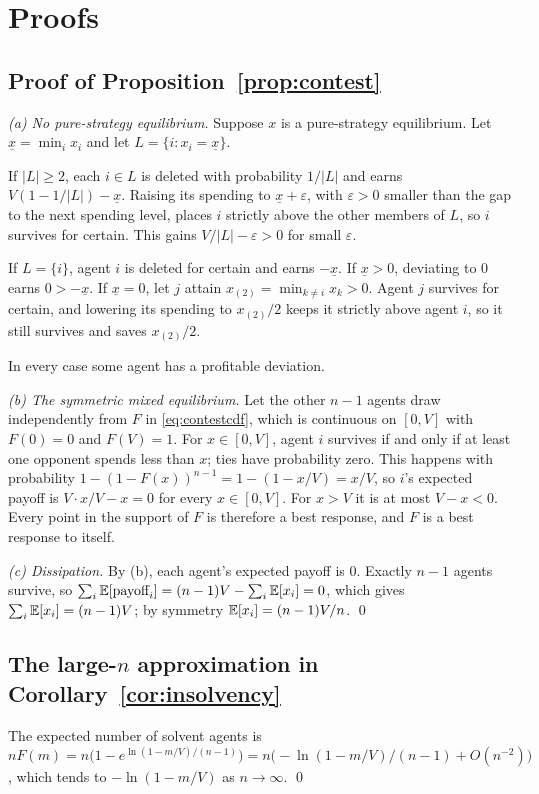 \section{Proofs}
\label{app:proofs}

\subsection{Proof of Proposition~\ref{prop:contest}}
\label{app:proof-contest}

\emph{(a) No pure-strategy equilibrium.}
Suppose $x$ is a pure-strategy equilibrium. Let $\underline{x}=\min_i x_i$ and let $L=\{i:x_i=\underline{x}\}$.

If $|L|\ge2$, each $i\in L$ is deleted with probability $1/|L|$ and earns $V(1-1/|L|)-\underline{x}$.
Raising its spending to $\underline{x}+\varepsilon$, with $\varepsilon>0$ smaller than the gap to the next spending level, places $i$ strictly above the other members of $L$, so $i$ survives for certain. This gains $V/|L|-\varepsilon>0$ for small $\varepsilon$.

If $L=\{i\}$, agent $i$ is deleted for certain and earns $-\underline{x}$.
If $\underline{x}>0$, deviating to $0$ earns $0>-\underline{x}$.
If $\underline{x}=0$, let $j$ attain $x_{(2)}=\min_{k\ne i}x_k>0$. Agent $j$ survives for certain, and lowering its spending to $x_{(2)}/2$ keeps it strictly above agent $i$, so it still survives and saves $x_{(2)}/2$.

In every case some agent has a profitable deviation.

\emph{(b) The symmetric mixed equilibrium.}
Let the other $n-1$ agents draw independently from $F$ in \eqref{eq:contestcdf}, which is continuous on $[0,V]$ with $F(0)=0$ and $F(V)=1$.
For $x\in[0,V]$, agent $i$ survives if and only if at least one opponent spends less than $x$; ties have probability zero.
This happens with probability $1-(1-F(x))^{n-1}=1-(1-x/V)=x/V$, so $i$'s expected payoff is $V\cdot x/V-x=0$ for every $x\in[0,V]$.
For $x>V$ it is at most $V-x<0$.
Every point in the support of $F$ is therefore a best response, and $F$ is a best response to itself.

\emph{(c) Dissipation.}
By (b), each agent's expected payoff is $0$.
Exactly $n-1$ agents survive, so $\sum_i\mathbb{E}[\text{payoff}_i]=(n-1)V-\sum_i\mathbb{E}[x_i]=0$, which gives $\sum_i\mathbb{E}[x_i]=(n-1)V$; by symmetry $\mathbb{E}[x_i]=(n-1)V/n$. \qed

\subsection{The large-$n$ approximation in Corollary~\ref{cor:insolvency}}
The expected number of solvent agents is $nF(m)=n\bigl(1-e^{\ln(1-m/V)/(n-1)}\bigr)=n\bigl(-\ln(1-m/V)/(n-1)+O(n^{-2})\bigr)$, which tends to $-\ln(1-m/V)$ as $n\to\infty$. \qed

